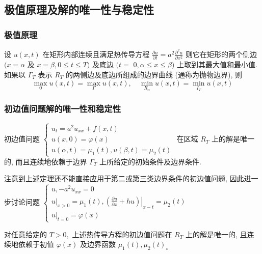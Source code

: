 \documentclass[10pt]{yerbaformat}
\begin{document}
\subsection{极值原理及解的唯一性与稳定性}

\subsubsection{极值原理}

\begin{theorem}[极值原理]
    设 $u(x, t)$ 在矩形内部连续且满足热传导方程 $\frac{\partial u}{\partial t}=a^{2} \frac{\partial^{2} u}{\partial x^{2}}$ 则它在矩形的两个侧边 $(x=\alpha$ 及 $x=\beta, 0 \leqslant t \leqslant T)$ 及底边 $(t=$ $0, \alpha \leqslant x \leqslant \beta)$ 上取到其最大值和最小值.如果以 $\Gamma_{T}$ 表示 $R_{T}$ 的两侧边及底边所组成的边界曲线 (通称为抛物边界), 则
    $$
        \max _{0} u(x, t)=\max _{\Gamma} u(x, t), \quad \min _{R_{\alpha}} u(x, t)=\min _{I_{T}} u(x, t)
    $$
\end{theorem}

\subsubsection{初边值问题解的唯一性和稳定性}

\begin{theorem}
    初边值问题 $ \left\{\begin{array}{l}
            u_{t}=a^{2} u_{x x}+f(x, t) \\
            u(x, 0)=\varphi(x)          \\
            u(\alpha, t)=\mu_{1}(t), u(\beta, t)=\mu_{2}(t)
        \end{array}\right.$ 在区域 $R_{T}$ 上的解是唯一的, 而且连续地依赖于边界 $\Gamma_{T}$ 上所给定的初始条件及边界条件.
\end{theorem}

\par 注意到上述定理还不能直接应用于第二或第三类边界条件的初边值问题, 因此进一步讨论问题 $\left\{\begin{array}{l}u,-a^{2} u_{x x}=0 \\ \left.u\right|_{x>0}=\mu_{1}(t),\left.\left(\frac{\partial u}{\partial x}+h u\right)\right|_{x-t}=\mu_{2}(t) \\ \left.u\right|_{t=0}=\varphi(x)\end{array}\right.$

\begin{theorem}
    对任意给定的 $T>0,$ 上述热传导方程的初边值问题在 $R_{T}$ 上的解是唯一的, 且连续地依赖于初值 $\varphi(x)$ 及边界函数 $\mu_{1}(t), \mu_{2}(t)_{\circ}$
\end{theorem}
\end{document}
